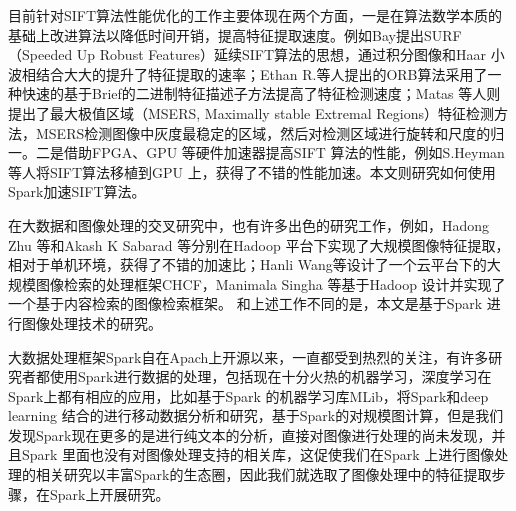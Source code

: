 目前针对SIFT算法性能优化的工作主要体现在两个方面，一是在算法数学本质的基础上改进算法以降低时间开销，提高特征提取速度。例如Bay提出SURF（Speeded Up Robust Features）延续SIFT算法的思想，通过积分图像和Haar 小波相结合大大的提升了特征提取的速率；Ethan R.等人提出的ORB算法采用了一种快速的基于Brief的二进制特征描述子方法提高了特征检测速度；Matas 等人则提出了最大极值区域（MSERS, Maximally stable Extremal Regions）特征检测方法，MSERS检测图像中灰度最稳定的区域，然后对检测区域进行旋转和尺度的归一。二是借助FPGA、GPU 等硬件加速器提高SIFT 算法的性能，例如S.Heyman 等人将SIFT算法移植到GPU 上，获得了不错的性能加速。本文则研究如何使用Spark加速SIFT算法。

在大数据和图像处理的交叉研究中，也有许多出色的研究工作，例如，Hadong Zhu 等和Akash K Sabarad 等分别在Hadoop 平台下实现了大规模图像特征提取，相对于单机环境，获得了不错的加速比；Hanli Wang等设计了一个云平台下的大规模图像检索的处理框架CHCF，Manimala Singha 等基于Hadoop 设计并实现了一个基于内容检索的图像检索框架。 和上述工作不同的是，本文是基于Spark 进行图像处理技术的研究。

大数据处理框架Spark自在Apach上开源以来，一直都受到热烈的关注，有许多研究者都使用Spark进行数据的处理，包括现在十分火热的机器学习，深度学习在Spark上都有相应的应用，比如基于Spark 的机器学习库MLib，将Spark和deep learning 结合的进行移动数据分析和研究，基于Spark的对规模图计算，但是我们发现Spark现在更多的是进行纯文本的分析，直接对图像进行处理的尚未发现，并且Spark 里面也没有对图像处理支持的相关库，这促使我们在Spark 上进行图像处理的相关研究以丰富Spark的生态圈，因此我们就选取了图像处理中的特征提取步骤，在Spark上开展研究。

